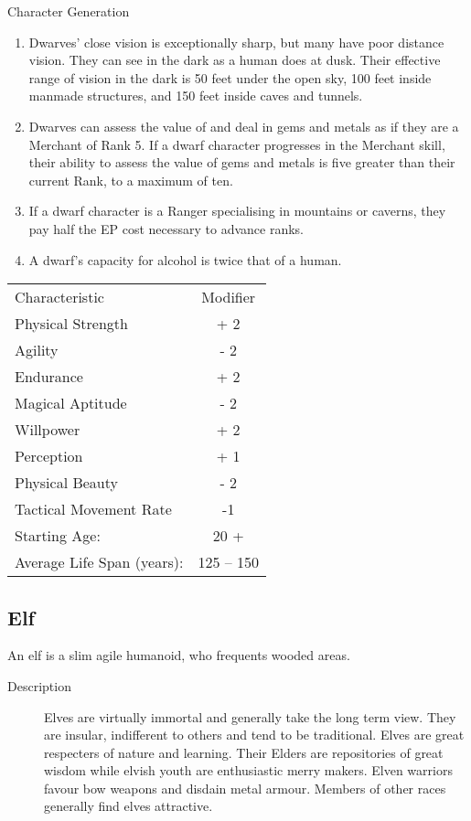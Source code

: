 \begin{Chapter}{Character Generation}
\begin{enumerate}
\item Dwarves’ close vision is exceptionally sharp, but many have poor
  distance vision.  They can see in the dark as a human does at dusk.
  Their effective range of vision in the dark is 50 feet under the
  open sky, 100 feet inside manmade structures, and 150 feet inside
  caves and tunnels.

\item Dwarves can assess the value of and deal in gems and metals as
  if they are a Merchant of Rank 5.  If a dwarf character progresses
  in the Merchant skill, their ability to assess the value of gems and
  metals is five greater than their current Rank, to a maximum of ten.

\item If a dwarf character is a Ranger specialising in mountains or
  caverns, they pay half the EP cost necessary to advance ranks.

\item A dwarf’s capacity for alcohol is twice that of a human.

\end{enumerate}

\begin{tabularx}{\columnwidth}{Xc} 
Characteristic			& Modifier \\
Physical Strength		& + 2 \\
Agility				& - 2 \\
Endurance			& + 2 \\
Magical Aptitude		& - 2 \\
Willpower			& + 2 \\
Perception			& + 1 \\
Physical Beauty			& - 2 \\
Tactical Movement Rate		& -1 \\
Starting Age:			& 20 + \\
Average Life Span (years):	& 125 -- 150 \\
\end{tabularx}

\subsection{Elf}

An elf is a slim agile humanoid, who frequents wooded areas.

\begin{description}
\item[Description] Elves are virtually immortal and generally take the
  long term view.  They are insular, indifferent to others and tend to
  be traditional.  Elves are great respecters of nature and learning.
  Their Elders are repositories of great wisdom while elvish youth are
  enthusiastic merry makers.  Elven warriors favour bow weapons and
  disdain metal armour.  Members of other races generally find elves
  attractive.
\end{description}


\end{Chapter}
